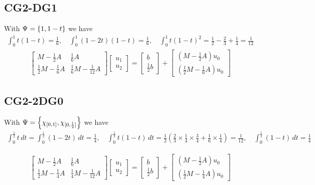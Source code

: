 \documentclass[english,12pt,a4paper]{article}
\begin{document}
\subsection{CG2-DG1}\label{subsec:}
%
With $\Psi=\left\{1, 1-t\right\}$ we have
%
\begin{align*}
\int_0^1t(1-t)=\frac16,\quad \int_0^1 (1-2t)(1-t)=\frac16,\quad \int_0^1 t(1-t)^2=\frac12 - \frac23 + \frac14=\frac1{12}
\end{align*}
%
%
\begin{align*}
\begin{bmatrix}
M - \frac12 A & \frac16 A\\
\frac12 M - \frac16 A &  \frac16 M - \frac1{12} A
\end{bmatrix}
\begin{bmatrix}
u_1 \\ u_2
\end{bmatrix}
=
\begin{bmatrix}
b \\\frac12 b
\end{bmatrix}
+
\begin{bmatrix}
(M - \frac12 A) u_0  \\ (\frac12 M - \frac16 A) u_0 
\end{bmatrix}
\end{align*}
%
%
\subsection{CG2-2DG0}\label{subsec:}
%
With $\Psi=\left\{\chi_{[0,1]}, \chi_{[0,\frac12]}\right\}$ we have
%
\begin{align*}
\int_0^{\frac12} t\,dt = \int_0^{\frac12} (1-2t)\,dt = \frac14,\quad \int_0^{\frac12} t(1-t)\,dt = \frac12(\frac23\times\frac14\times\frac34 + \frac16\times\frac14 )=\frac{1}{12},\quad
\int_0^{\frac12} (1-t)\,dt =\frac14
\end{align*}
%

%
\begin{align*}
\begin{bmatrix}
M - \frac12 A & \frac16 A\\
\frac12 M - \frac14 A & \frac14 M - \frac1{12} A
\end{bmatrix}
\begin{bmatrix}
u_1 \\ u_2
\end{bmatrix}
=
\begin{bmatrix}
b \\\frac12 b
\end{bmatrix}
+
\begin{bmatrix}
(M - \frac12 A) u_0  \\ (\frac12 M - \frac14 A) u_0 
\end{bmatrix}
\end{align*}
%
%
\end{document}
